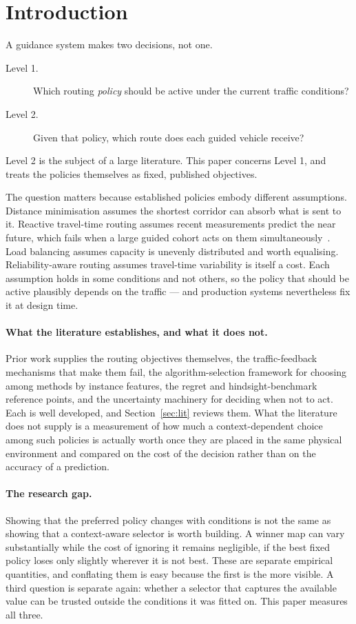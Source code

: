 \documentclass[runningheads]{llncs}
\begin{document}
\section{Introduction}

A guidance system makes two decisions, not one.

\begin{description}
\item[Level 1.] Which routing \emph{policy} should be active under the current
traffic conditions?
\item[Level 2.] Given that policy, which route does each guided vehicle receive?
\end{description}

Level 2 is the subject of a large literature. This paper concerns Level 1, and
treats the policies themselves as fixed, published objectives.

The question matters because established policies embody different assumptions.
Distance minimisation assumes the shortest corridor can absorb what is sent to
it. Reactive travel-time routing assumes recent measurements predict the near
future, which fails when a large guided cohort acts on them
simultaneously~\cite{arnott1991information,acemoglu2018braess}. Load balancing
assumes capacity is unevenly distributed and worth equalising. Reliability-aware
routing assumes travel-time variability is itself a cost. Each assumption holds
in some conditions and not others, so the policy that should be active
plausibly depends on the traffic --- and production systems nevertheless fix it
at design time.

\paragraph{What the literature establishes, and what it does not.}
Prior work supplies the routing objectives themselves, the traffic-feedback
mechanisms that make them fail, the algorithm-selection framework for choosing
among methods by instance features, the regret and hindsight-benchmark
reference points, and the uncertainty machinery for deciding when not to act.
Each is well developed, and Section~\ref{sec:lit} reviews them. What the
literature does not supply is a measurement of how much a context-dependent
choice among such policies is actually worth once they are placed in the same
physical environment and compared on the cost of the decision rather than on
the accuracy of a prediction.

\paragraph{The research gap.}
Showing that the preferred policy changes with conditions is not the same as
showing that a context-aware selector is worth building. A winner map can vary
substantially while the cost of ignoring it remains negligible, if the best
fixed policy loses only slightly wherever it is not best. These are separate
empirical quantities, and conflating them is easy because the first is the more
visible. A third question is separate again: whether a selector that captures
the available value can be trusted outside the conditions it was fitted on.
This paper measures all three.
\end{document}
